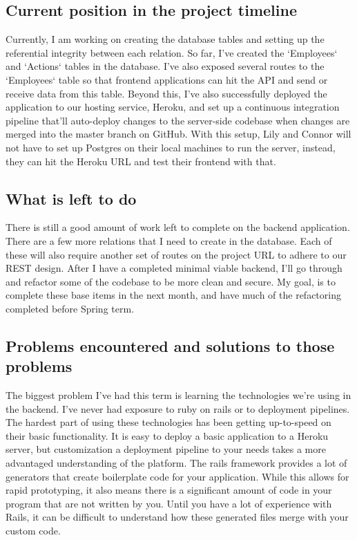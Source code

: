 \documentclass[draftclsnofoot,onecolumn,letterpaper,10pt,compsoc]{IEEEtran}
\begin{document}
\subsection{Current position in the project timeline}
Currently, I am working on creating the database tables and setting up the referential integrity between each relation.
So far, I’ve created the `Employees` and `Actions` tables in the database.
I’ve also exposed several routes to the `Employees` table so that frontend applications can hit the API and send or receive data from this table.
Beyond this, I’ve also successfully deployed the application to our hosting service, Heroku, and set up a continuous integration pipeline that’ll auto-deploy changes to the server-side codebase when changes are merged into the master branch on GitHub.
With this setup, Lily and Connor will not have to set up Postgres on their local machines to run the server, instead, they can hit the Heroku URL and test their frontend with that.

\subsection{What is left to do}
There is still a good amount of work left to complete on the backend application.
There are a few more relations that I need to create in the database.
Each of these will also require another set of routes on the project URL to adhere to our REST design.
After I have a completed minimal viable backend, I’ll go through and refactor some of the codebase to be more clean and secure.
My goal, is to complete these base items in the next month, and have much of the refactoring completed before Spring term.

\subsection{Problems encountered and solutions to those problems}
The biggest problem I’ve had this term is learning the technologies we’re using in the backend.
I’ve never had exposure to ruby on rails or to deployment pipelines.
The hardest part of using these technologies has been getting up-to-speed on their basic functionality.
It is easy to deploy a basic application to a Heroku server, but customization a deployment pipeline to your needs takes a more advantaged understanding of the platform.
The rails framework provides a lot of generators that create boilerplate code for your application.
While this allows for rapid prototyping, it also means there is a significant amount of code in your program that are not written by you.
Until you have a lot of experience with Rails, it can be difficult to understand how these generated files merge with your custom code.
\end{document}
